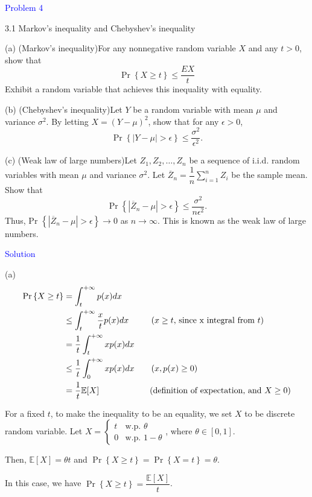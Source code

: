 \textcolor{blue}{Problem 4}

3.1 Markov's inequality and Chebyshev's inequality

(a) (Markov's inequality)\quad For any nonnegative random variable $X$ and any $t>0$, show that
$$\Pr\left\{X\geq t\right\}\leq\dfrac{EX}t$$
Exhibit a random variable that achieves this inequality with equality.

(b) (Chebyshev's inequality)\quad Let $Y$ be a random variable with mean $\mu$ and variance $\sigma^2.$ By letting $X=(Y-\mu)^2$, show that for any $\epsilon>0$,
$$\Pr\left\{|Y-\mu|>\epsilon\right\}\leq\dfrac{\sigma^2}{\epsilon^2}.$$

(c) (Weak law of large numbers)\quad Let $Z_1,Z_2,\ldots,Z_n$ be a sequence of i.i.d. random variables with mean $\mu$ and variance $\sigma^2$. Let $\overline{Z}_n=\dfrac1n\sum\limits_{i=1}^nZ_i$ be the sample mean. Show that
$$\Pr\left\{\left|\overline{Z}_n-\mu\right|>\epsilon\right\}\leq\dfrac{\sigma^2}{n\epsilon^2}.$$
Thus, Pr $\left\{\left|\overline{Z}_n-\mu\right|>\epsilon\right\}\to0$ as $n\to\infty.$ This is known as the weak law of large numbers.

\textcolor{blue}{Solution}

(a)
\begin{align*}
\Pr\left\{X\geq t\right\} &= \int_{t}^{+\infty} p(x) dx \\
&\leq \int_{t}^{+\infty} \dfrac{x}{t} p(x) dx \text{\quad\quad\ \ ($x\geq t$, since x integral from $t$)} \\
&= \dfrac{1}{t} \int_{t}^{+\infty} x p(x) dx \\
&\leq \dfrac{1}{t} \int_{0}^{+\infty} x p(x) dx \text{\quad\quad($x,p(x)\geq 0$)} \\
&= \dfrac{1}{t} \mathbb{E}[X] \text{\quad\quad\quad\quad\quad\quad(definition of expectation, and $X\geq 0$)}
\end{align*}

For a fixed $t$, to make the inequality to be an equality, we set $X$ to be discrete random variable.
Let $X=\left\{\begin{array}{ll}t & \text{w.p.\ \ } \theta \\ 0 & \text{w.p.\ \ } 1-\theta \end{array}\right.$, where $\theta\in[0,1]$.

Then, $\mathbb{E}[X]=\theta t$ and $\Pr\left\{X\geq t\right\}=\Pr\left\{X=t\right\}=\theta$.

In this case, we have $\Pr\left\{X\geq t\right\}= \dfrac{\mathbb{E}[X]}{t}$.

